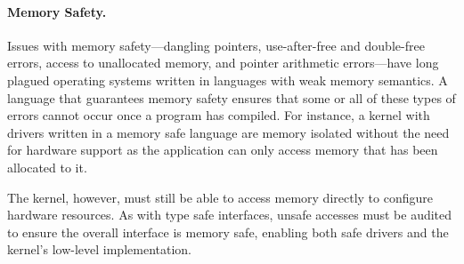\paragraph{Memory Safety.}
Issues with memory safety---dangling pointers, use-after-free and
double-free errors, access to unallocated memory, and pointer arithmetic
errors---have long plagued operating systems written in
languages with weak memory semantics.
A language that guarantees memory safety ensures that some or all of
these types of errors cannot occur once a program has compiled.
For instance, a kernel with drivers written in a memory safe language are
memory isolated without the need for hardware support as the
application can only access memory that has been allocated to it.


The kernel, however, must still be able to access memory directly
to configure hardware resources.
As with type safe interfaces, unsafe accesses must be audited to ensure
the overall interface is memory safe, enabling both safe drivers and
the kernel's low-level implementation.

